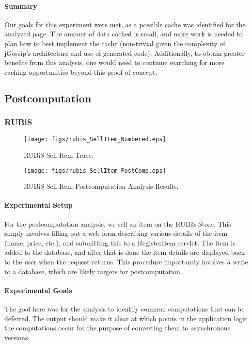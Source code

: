 \documentclass[msc,oneside]{ubcthesis}
\begin{document}
\paragraph{Summary}
Our goals for this experiment were met, as a possible cache was identified for the analyzed page. The amount of data cached is small, and more work is needed to plan how to best implement the cache (non-trivial given the complexity of jGossip's architecture and use of generated code). Additionally, to obtain greater benefits from this analysis, one would need to continue searching for more caching opportunities beyond this proof-of-concept.

\subsection{Postcomputation}
\label{ana:postcomp}
\subsubsection{RUBiS}

\begin{sidewaysfigure}
\centering
\scalebox{0.44}
{\texttt{[image: figs/rubis\_SellItem\_Numbered.eps]}}
\caption{RUBiS Sell Item Trace.} 
\label{fig:sellitemtrace}
\end{sidewaysfigure}

\begin{sidewaysfigure}
\centering
\scalebox{0.44}
{\texttt{[image: figs/rubis\_SellItem\_PostComp.eps]}}
\caption{RUBiS Sell Item Postcomputation Analysis Results.} 
\label{fig:sellitempostcomputation}
\end{sidewaysfigure}

\paragraph{Experimental Setup}
For the postcomputation analysis, we sell an item on the RUBiS Store. This simply involves filling out a web form describing various details of the item (name, price, etc.), and submitting this to a RegisterItem servlet. The item is added to the database, and after that is done the item details are displayed back to the user when the request returns. This procedure importantly involves a write to a database, which are likely targets for postcomputation.

\paragraph{Experimental Goals}
The goal here was for the analysis to identify common computations that can be deferred. The output should make it clear at which points in the application logic the computations occur for the purpose of converting them to asynchronous versions.
\end{document}
